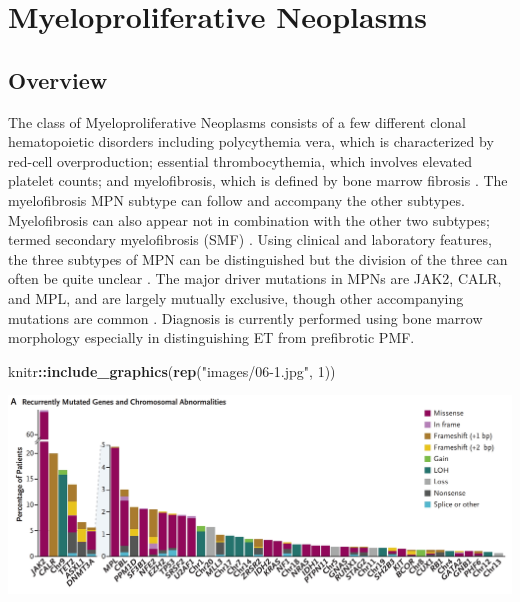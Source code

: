 \documentclass[]{book}
\newenvironment{Shaded}{\begin{snugshade}}{\end{snugshade}}
\newcommand{\DecValTok}[1]{\textcolor[rgb]{0.00,0.00,0.81}{#1}}
\newcommand{\KeywordTok}[1]{\textcolor[rgb]{0.13,0.29,0.53}{\textbf{#1}}}
\newcommand{\NormalTok}[1]{#1}
\newcommand{\OperatorTok}[1]{\textcolor[rgb]{0.81,0.36,0.00}{\textbf{#1}}}
\newcommand{\StringTok}[1]{\textcolor[rgb]{0.31,0.60,0.02}{#1}}
\begin{document}
\hypertarget{myeloproliferative-neoplasms}{%
\section{Myeloproliferative Neoplasms}\label{myeloproliferative-neoplasms}}

\hypertarget{overview}{%
\subsection{Overview}\label{overview}}

The class of Myeloproliferative Neoplasms consists of a few different clonal hematopoietic disorders including polycythemia vera, which is characterized by red-cell overproduction; essential thrombocythemia, which involves elevated platelet counts; and myelofibrosis, which is defined by bone marrow fibrosis \citep{grinfeld2018classification}. The myelofibrosis MPN subtype can follow and accompany the other subtypes. Myelofibrosis can also appear not in combination with the other two subtypes; termed secondary myelofibrosis (SMF) \citep{mesa2012epidemiology}. Using clinical and laboratory features, the three subtypes of MPN can be distinguished but the division of the three can often be quite unclear \citep{wilkins2008bone, tefferi2014overview}. The major driver mutations in MPNs are JAK2, CALR, and MPL, and are largely mutually exclusive, though other accompanying mutations are common \citep{tefferi2015myeloproliferative}. Diagnosis is currently performed using bone marrow morphology especially in distinguishing ET from prefibrotic PMF.

\begin{Shaded}
\begin{Highlighting}[]
\NormalTok{knitr}\OperatorTok{::}\KeywordTok{include_graphics}\NormalTok{(}\KeywordTok{rep}\NormalTok{(}\StringTok{"images/06-1.jpg"}\NormalTok{, }\DecValTok{1}\NormalTok{))          }
\end{Highlighting}
\end{Shaded}

\includegraphics{images/06-1.jpg}
\end{document}
